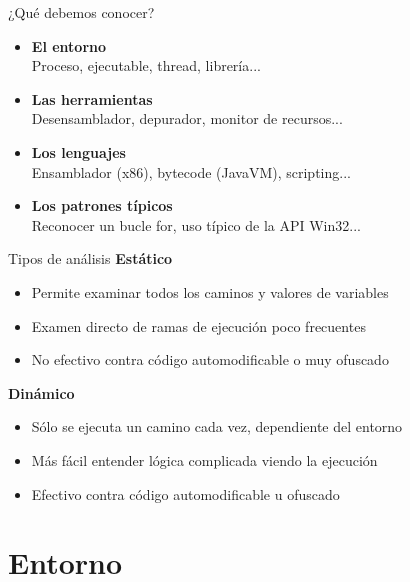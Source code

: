 \documentclass{beamer}
\begin{document}
\begin{frame}{¿Qué debemos conocer?}
\begin{itemize}
\item \textbf{El entorno} \\ \hspace{4ex}Proceso, ejecutable, thread, librería...
\item \textbf{Las herramientas} \\ \hspace{4ex}Desensamblador, depurador, monitor de recursos...
\item \textbf{Los lenguajes} \\ \hspace{4ex}Ensamblador (x86), bytecode (JavaVM), scripting...
\item \textbf{Los patrones típicos} \\ \hspace{4ex}Reconocer un bucle for, uso típico de la API Win32...
\end{itemize}

\end{frame}

\begin{frame}{Tipos de análisis}
\vspace{-3ex}
\textbf{Estático}
\begin{itemize}
	\item Permite examinar todos los caminos y valores de variables
	\item Examen directo de ramas de ejecución poco frecuentes
	\item No efectivo contra código automodificable o muy ofuscado
\end{itemize}
\textbf{Dinámico}
\begin{itemize}
	\item Sólo se ejecuta un camino cada vez, dependiente del entorno
	\item Más fácil entender lógica complicada viendo la ejecución
	\item Efectivo contra código automodificable u ofuscado
\end{itemize}

\end{frame}

\section{Entorno}
\end{document}
